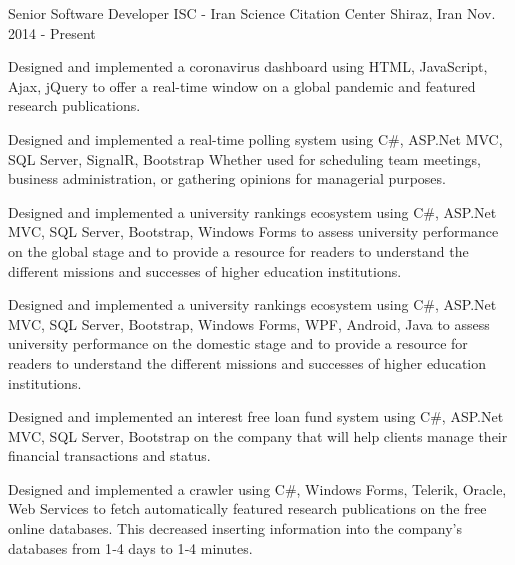 


\begin{cventries}


\cventry
{Senior Software Developer} %
{ISC - Iran Science Citation Center} %
{Shiraz, Iran} %
{Nov. 2014 - Present} %
{ %
\begin{cvitems}
\item {Designed and implemented a coronavirus dashboard using HTML, JavaScript, Ajax, jQuery to offer a real-time window on a global pandemic and featured research publications.}
\item {Designed and implemented a real-time polling system using C\#, ASP.Net MVC, SQL Server, SignalR, Bootstrap Whether used for scheduling team meetings, business administration, or gathering opinions for managerial purposes.}
\item {Designed and implemented a university rankings ecosystem using C\#, ASP.Net MVC, SQL Server, Bootstrap, Windows Forms to assess university performance on the global stage and to provide a resource for readers to understand the different missions and successes of higher education institutions.}
\item {Designed and implemented a university rankings ecosystem using C\#, ASP.Net MVC, SQL Server, Bootstrap, Windows Forms, WPF, Android, Java to assess university performance on the domestic stage and to provide a resource for readers to understand the different missions and successes of higher education institutions.}
\item {Designed and implemented an interest free loan fund system using C\#, ASP.Net MVC, SQL Server, Bootstrap on the company that will help clients manage their financial transactions and status.}
\item {Designed and implemented a crawler using C\#, Windows Forms, Telerik, Oracle, Web Services to fetch automatically featured research publications on the free online databases. This decreased inserting information into the company's databases from 1‑4 days to 1‑4 minutes.}
\end{cvitems}
}


\end{cventries}
